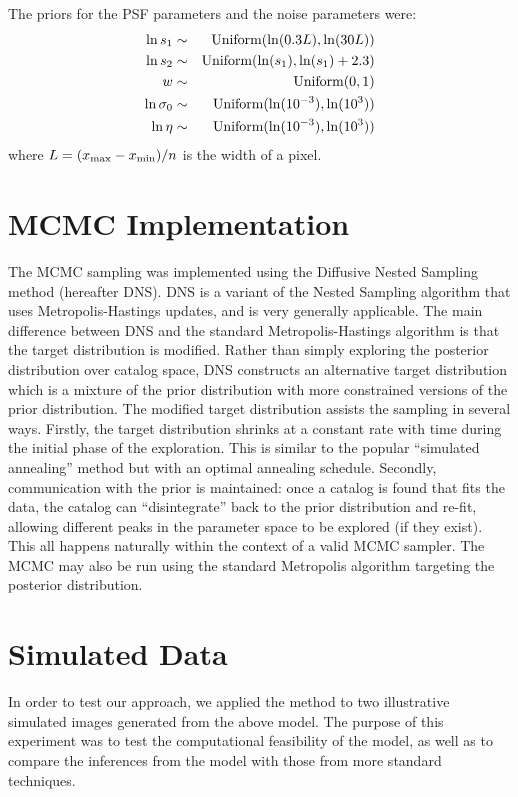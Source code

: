\documentclass[12pt, preprint]{aastex}
\begin{document}
The priors for the PSF parameters and the noise parameters were:
\begin{eqnarray}
\ln s_1 &\sim& \textnormal{Uniform}(\ln(0.3L), \ln(30L)) \\
\ln s_2 &\sim& \textnormal{Uniform}(\ln(s_1), \ln(s_1) + 2.3) \\
w &\sim& \textnormal{Uniform}(0, 1)\\
\ln \sigma_0 &\sim& \textnormal{Uniform}(\ln(10^{-3}), \ln(10^{3})) \\
\ln \eta &\sim& \textnormal{Uniform}(\ln(10^{-3}), \ln(10^{3}))
\end{eqnarray}
where $L = (x_{\rm max} - x_{\rm min})/n$ is the width of a pixel.

\section{MCMC Implementation}\label{sec:mcmc}
The MCMC sampling was implemented using the Diffusive Nested Sampling
\citep{dnest} method (hereafter DNS). DNS is a variant of the
Nested Sampling \citep{skilling} algorithm that uses Metropolis-Hastings
updates, and
is very generally applicable. The main difference between DNS and the standard
Metropolis-Hastings algorithm is that the target distribution is modified.
Rather than simply exploring the posterior distribution over catalog space,
DNS constructs an alternative target distribution which is a mixture of the
prior distribution with more constrained versions of the prior distribution.
The modified target distribution assists the sampling in several ways.
Firstly, the target distribution shrinks at a constant rate with time during the
initial phase of the exploration. This is similar to the popular ``simulated
annealing'' method \citep{annealing, neal} but with an optimal annealing schedule. Secondly,
communication with the prior is maintained: once a catalog is found that
fits the data, the catalog can ``disintegrate'' back to the prior distribution
and re-fit, allowing different peaks in the parameter space to be explored
(if they exist). This all happens naturally within the context of a valid
MCMC sampler. The MCMC may also be run using the standard Metropolis algorithm
targeting the posterior distribution.

\section{Simulated Data}\label{sec:simulated_data}
In order to test our approach, we applied the method to two illustrative
simulated images generated from
the above model. The purpose of this experiment was to test the computational
feasibility of the model, as well as to compare the inferences from the model
with those from more standard techniques.
\end{document}
